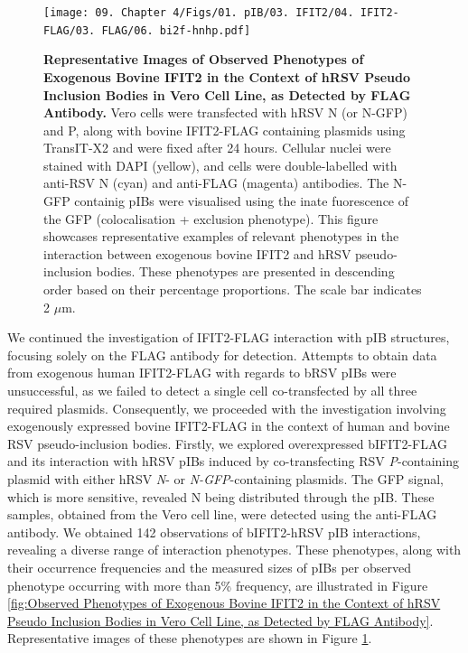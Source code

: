 \begin{figure}
    \centering
    \texttt{[image: 09. Chapter 4/Figs/01. pIB/03. IFIT2/04. IFIT2-FLAG/03. FLAG/06. bi2f-hnhp.pdf]}
    \caption[Representative Images of Observed Phenotypes of Exogenous Bovine IFIT2 in the Context of hRSV Pseudo Inclusion Bodies in Vero Cell Line, as Detected by FLAG Antibody.]{\textbf{Representative Images of Observed Phenotypes of Exogenous Bovine IFIT2 in the Context of hRSV Pseudo Inclusion Bodies in Vero Cell Line, as Detected by FLAG Antibody.} Vero cells were transfected with hRSV N (or N-GFP) and P, along with bovine IFIT2-FLAG containing plasmids using TransIT-X2 and were fixed after 24 hours. Cellular nuclei were stained with DAPI (yellow), and cells were double-labelled with anti-RSV N (cyan) and anti-FLAG (magenta) antibodies. The N-GFP containig pIBs were visualised using the inate fuorescence of the GFP (colocalisation + exclusion phenotype). This figure showcases representative examples of relevant phenotypes in the interaction between exogenous bovine IFIT2 and hRSV pseudo-inclusion bodies. These phenotypes are presented in descending order based on their percentage proportions. The scale bar indicates 2 \(\mu \mbox{m}\).}
    \label{fig:Representative Images of Observed Phenotypes of Exogenous Bovine IFIT2 in the Context of hRSV Pseudo Inclusion Bodies in Vero Cell Line, as Detected by FLAG Antibody}
\end{figure}

We continued the investigation of IFIT2-FLAG interaction with pIB structures, focusing solely on the FLAG antibody for detection. Attempts to obtain data from exogenous human IFIT2-FLAG with regards to bRSV pIBs were unsuccessful, as we failed to detect a single cell co-transfected by all three required plasmids. Consequently, we proceeded with the investigation involving exogenously expressed bovine IFIT2-FLAG in the context of human and bovine RSV pseudo-inclusion bodies. Firstly, we explored overexpressed bIFIT2-FLAG and its interaction with hRSV pIBs induced by co-transfecting RSV \textit{P}-containing plasmid with either hRSV \textit{N}- or \textit{N-GFP}-containing plasmids. The GFP signal, which is more sensitive, revealed N being distributed through the pIB. These samples, obtained from the Vero cell line, were detected using the anti-FLAG antibody. We obtained 142 observations of bIFIT2-hRSV pIB interactions, revealing a diverse range of interaction phenotypes. These phenotypes, along with their occurrence frequencies and the measured sizes of pIBs per observed phenotype occurring with more than 5\% frequency, are illustrated in Figure \ref{fig:Observed Phenotypes of Exogenous Bovine IFIT2 in the Context of hRSV Pseudo Inclusion Bodies in Vero Cell Line, as Detected by FLAG Antibody}. Representative images of these phenotypes are shown in Figure \ref{fig:Representative Images of Observed Phenotypes of Exogenous Bovine IFIT2 in the Context of hRSV Pseudo Inclusion Bodies in Vero Cell Line, as Detected by FLAG Antibody}.


